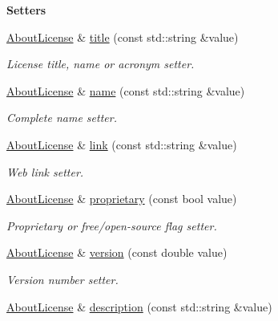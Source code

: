 \begin{Indent}{\bf Setters}\par
\begin{DoxyCompactItemize}
\item 
\hyperlink{exceptionmagrathea_1_1AboutLicense}{About\-License} \& \hyperlink{exceptionmagrathea_1_1AboutLicense_a7649d777dc5c3a8df8c3667020f2ff9f}{title} (const std\-::string \&value)
\begin{DoxyCompactList}\small\item\em License title, name or acronym setter. \end{DoxyCompactList}\item 
\hyperlink{exceptionmagrathea_1_1AboutLicense}{About\-License} \& \hyperlink{exceptionmagrathea_1_1AboutLicense_af22177cbdf02b629fcef842258bded55}{name} (const std\-::string \&value)
\begin{DoxyCompactList}\small\item\em Complete name setter. \end{DoxyCompactList}\item 
\hyperlink{exceptionmagrathea_1_1AboutLicense}{About\-License} \& \hyperlink{exceptionmagrathea_1_1AboutLicense_ad1ed0340d326d9b7e5d00f49cf4a2249}{link} (const std\-::string \&value)
\begin{DoxyCompactList}\small\item\em Web link setter. \end{DoxyCompactList}\item 
\hyperlink{exceptionmagrathea_1_1AboutLicense}{About\-License} \& \hyperlink{exceptionmagrathea_1_1AboutLicense_a719d9996aa99ea70c71035f3c58aa2f9}{proprietary} (const bool value)
\begin{DoxyCompactList}\small\item\em Proprietary or free/open-\/source flag setter. \end{DoxyCompactList}\item 
\hyperlink{exceptionmagrathea_1_1AboutLicense}{About\-License} \& \hyperlink{exceptionmagrathea_1_1AboutLicense_a257a6077fa3a862cec477fed63597229}{version} (const double value)
\begin{DoxyCompactList}\small\item\em Version number setter. \end{DoxyCompactList}\item 
\hyperlink{exceptionmagrathea_1_1AboutLicense}{About\-License} \& \hyperlink{exceptionmagrathea_1_1AboutLicense_a6269ef58ec7627e164701872d6eb4e5d}{description} (const std\-::string \&value)

\end{DoxyCompactItemize}
\end{Indent}
